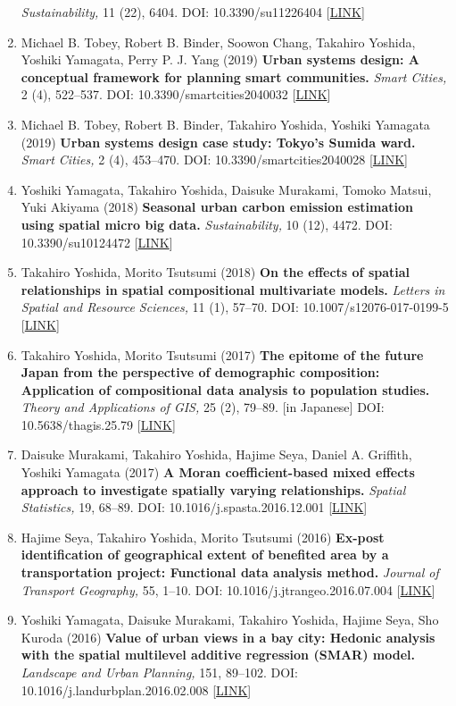 \documentclass[
]{book}
\begin{document}
\begin{enumerate}
  \emph{Sustainability,} 11 (22), 6404.
  DOI: 10.3390/su11226404 {[}\href{https://www.mdpi.com/2071-1050/11/22/6404}{LINK}{]}
\item
  Michael B. Tobey, Robert B. Binder, Soowon Chang, Takahiro Yoshida, Yoshiki Yamagata, Perry P. J. Yang (2019)
  \textbf{Urban systems design: A conceptual framework for planning smart communities.}
  \emph{Smart Cities,} 2 (4), 522--537.
  DOI: 10.3390/smartcities2040032 {[}\href{https://www.mdpi.com/2624-6511/2/4/32}{LINK}{]}
\item
  Michael B. Tobey, Robert B. Binder, Takahiro Yoshida, Yoshiki Yamagata (2019)
  \textbf{Urban systems design case study: Tokyo's Sumida ward.}
  \emph{Smart Cities,} 2 (4), 453--470.
  DOI: 10.3390/smartcities2040028 {[}\href{https://www.mdpi.com/2624-6511/2/4/28}{LINK}{]}
\item
  Yoshiki Yamagata, Takahiro Yoshida, Daisuke Murakami, Tomoko Matsui, Yuki Akiyama (2018)
  \textbf{Seasonal urban carbon emission estimation using spatial micro big data.}
  \emph{Sustainability,} 10 (12), 4472.
  DOI: 10.3390/su10124472 {[}\href{https://www.mdpi.com/2071-1050/10/12/4472}{LINK}{]}
\item
  Takahiro Yoshida, Morito Tsutsumi (2018)
  \textbf{On the effects of spatial relationships in spatial compositional multivariate models.}
  \emph{Letters in Spatial and Resource Sciences,} 11 (1), 57--70.
  DOI: 10.1007/s12076-017-0199-5 {[}\href{https://link.springer.com/article/10.1007/s12076-017-0199-5}{LINK}{]}
\item
  Takahiro Yoshida, Morito Tsutsumi (2017)
  \textbf{The epitome of the future Japan from the perspective of demographic composition: Application of compositional data analysis to population studies.}
  \emph{Theory and Applications of GIS,} 25 (2), 79--89. {[}in Japanese{]}
  DOI: 10.5638/thagis.25.79 {[}\href{https://www.jstage.jst.go.jp/article/thagis/25/2/25_79/_article/-char/en}{LINK}{]}
\item
  Daisuke Murakami, Takahiro Yoshida, Hajime Seya, Daniel A. Griffith, Yoshiki Yamagata (2017)
  \textbf{A Moran coefficient-based mixed effects approach to investigate spatially varying relationships.}
  \emph{Spatial Statistics,} 19, 68--89.
  DOI: 10.1016/j.spasta.2016.12.001 {[}\href{http://www.sciencedirect.com/science/article/pii/S2211675316301798}{LINK}{]}
\item
  Hajime Seya, Takahiro Yoshida, Morito Tsutsumi (2016)
  \textbf{Ex-post identification of geographical extent of benefited area by a transportation project: Functional data analysis method.}
  \emph{Journal of Transport Geography,} 55, 1--10.
  DOI: 10.1016/j.jtrangeo.2016.07.004 {[}\href{http://www.sciencedirect.com/science/article/pii/S0966692316303763}{LINK}{]}
\item
  Yoshiki Yamagata, Daisuke Murakami, Takahiro Yoshida, Hajime Seya, Sho Kuroda (2016)
  \textbf{Value of urban views in a bay city: Hedonic analysis with the spatial multilevel additive regression (SMAR) model.}
  \emph{Landscape and Urban Planning,} 151, 89--102.
  DOI: 10.1016/j.landurbplan.2016.02.008 {[}\href{http://www.sciencedirect.com/science/article/pii/S0169204616000232}{LINK}{]}
\end{enumerate}
\end{document}
